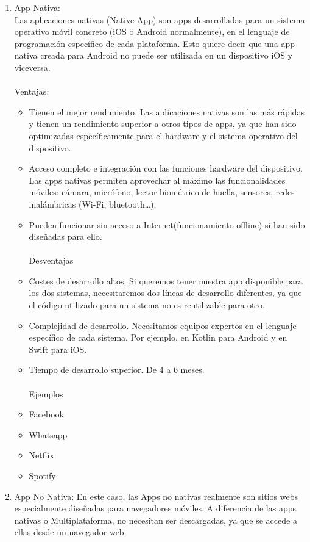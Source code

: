 \documentclass[12pt,twocolumn]{article}
\begin{document}
\begin{enumerate}
	\item App Nativa:
	\\
	Las aplicaciones nativas (Native App) son apps desarrolladas para un sistema operativo móvil concreto (iOS o Android normalmente), en el lenguaje de programación específico de cada plataforma. Esto quiere decir que una app nativa creada para Android no puede ser utilizada en un dispositivo iOS y viceversa.
	\\
	\\
	Ventajas:
	\begin{itemize}
		\item Tienen el mejor rendimiento. Las aplicaciones nativas son las más rápidas y tienen un rendimiento superior a otros tipos de apps, ya que han sido optimizadas específicamente para el hardware y el sistema operativo del dispositivo.
		\item Acceso completo e integración con las funciones hardware del dispositivo. Las apps nativas permiten aprovechar al máximo las funcionalidades móviles: cámara, micrófono, lector biométrico de huella, sensores, redes inalámbricas (Wi-Fi, bluetooth…).
		\item Pueden funcionar sin acceso a Internet(funcionamiento offline) si han sido diseñadas para ello.
		\\
		\\
		Desventajas
		\\
		\item Costes de desarrollo altos. Si queremos tener nuestra app disponible para los dos sistemas, necesitaremos dos líneas de desarrollo diferentes, ya que el código utilizado para un sistema no es reutilizable para otro. 
		\item Complejidad de desarrollo. Necesitamos equipos expertos en el lenguaje específico de cada sistema. Por ejemplo, en Kotlin para Android y en Swift para iOS.
		\item Tiempo de desarrollo superior. De 4 a 6 meses.
		\\
		\\
		Ejemplos
		\\
		\item Facebook 
		\item Whatsapp
		\item Netflix
		\item Spotify
	\end{itemize}
	\item App No Nativa:
	En este caso, las Apps no nativas realmente son sitios webs especialmente diseñadas para navegadores móviles. A diferencia de las apps nativas o Multiplataforma, no necesitan ser descargadas, ya que se accede a ellas desde un navegador web.
	

\end{enumerate}
\end{document}
